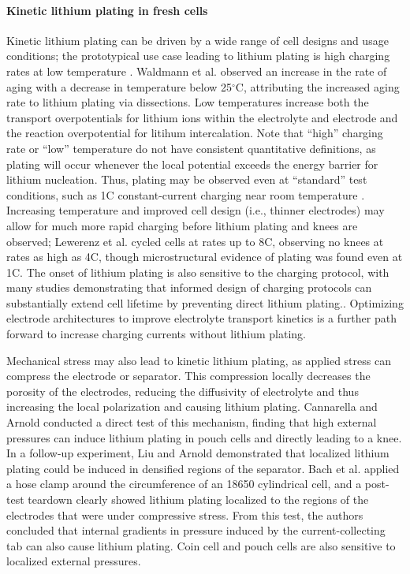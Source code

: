 \documentclass[journal=jpclcd,manuscript=article]{achemso}
\begin{document}
\paragraph{Kinetic lithium plating in fresh cells}
Kinetic lithium plating can be driven by a wide range of cell designs and usage conditions; the prototypical use case leading to lithium plating is high charging rates at low temperature \cite{waldmann_temperature_2014, petzl_lithium_2015}. Waldmann et al.\cite{waldmann_temperature_2014} observed an increase in the rate of aging with a decrease in temperature below 25$^{\circ}$C, attributing the increased aging rate to lithium plating via dissections. Low temperatures increase both the transport overpotentials for lithium ions within the electrolyte and electrode and the reaction overpotential for litihum intercalation. Note that ``high'' charging rate or ``low'' temperature do not have consistent quantitative definitions, as plating will occur whenever the local potential exceeds the energy barrier for lithium nucleation. Thus, plating may be observed even at ``standard'' test conditions, such as 1C constant-current charging near room temperature \cite{waldmann_optimization_2015,burns_-situ_2015}. Increasing temperature and improved cell design (i.e., thinner electrodes) may allow for much more rapid charging before lithium plating and knees are observed; Lewerenz et al.\cite{lewerenz_systematic_2017} cycled cells at rates up to 8C, observing no knees at rates as high as 4C, though microstructural evidence of plating was found even at 1C. The onset of lithium plating is also sensitive to the charging protocol, with many studies demonstrating that informed design of charging protocols can substantially extend cell lifetime by preventing direct lithium plating.\cite{waldmann_optimization_2015,schindler_fast_2018}. Optimizing electrode architectures to improve electrolyte transport kinetics is a further path forward to increase charging currents without lithium plating.\cite{nemani_design_2015, usseglio-viretta_enabling_2020}

Mechanical stress may also lead to kinetic lithium plating, as applied stress can compress the electrode or separator. This compression locally decreases the porosity of the electrodes, reducing the diffusivity of electrolyte and thus increasing the local polarization and causing lithium plating. Cannarella and Arnold\cite{cannarella_stress_2014} conducted a direct test of this mechanism, finding that high external pressures can induce lithium plating in pouch cells and directly leading to a knee. In a follow-up experiment, Liu and Arnold\cite{liu_effects_2020} demonstrated that localized lithium plating could be induced in densified regions of the separator. Bach et al.\cite{bach_nonlinear_2016} applied a hose clamp around the circumference of an 18650 cylindrical cell, and a post-test teardown clearly showed lithium plating localized to the regions of the electrodes that were under compressive stress. From this test, the authors concluded that internal gradients in pressure induced by the current-collecting tab can also cause lithium plating. Coin cell and pouch cells are also sensitive to localized external pressures.\cite{liu_size_2018, fuchs_post-mortem_2019, okasinski_situ_2020}
\end{document}
